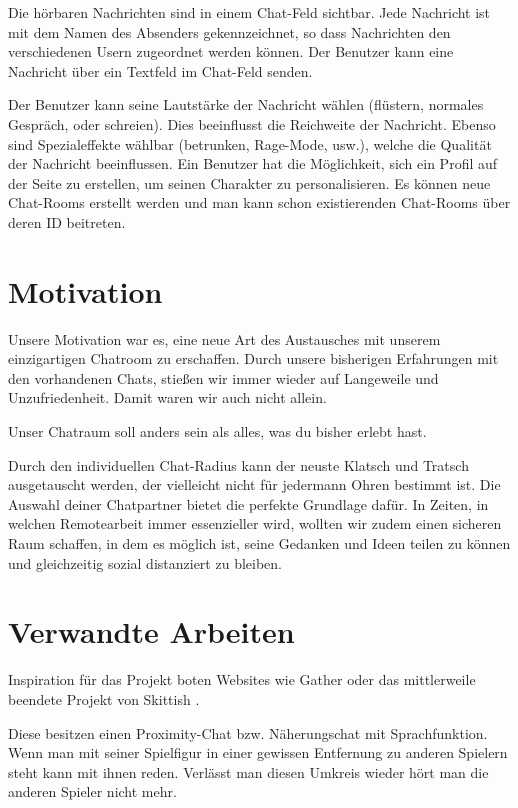 \documentclass[conference]{IEEEtran}
\begin{document}
	Die hörbaren Nachrichten sind in einem Chat-Feld sichtbar. Jede Nachricht ist mit dem Namen des Absenders gekennzeichnet, so dass Nachrichten den verschiedenen Usern zugeordnet werden können. Der Benutzer kann eine Nachricht über ein Textfeld im Chat-Feld senden.
	
	Der Benutzer kann seine Lautstärke der Nachricht wählen (flüstern, normales Gespräch, oder schreien). Dies beeinflusst die Reichweite der Nachricht. Ebenso sind Spezialeffekte wählbar (betrunken, Rage-Mode, usw.), welche die Qualität der Nachricht beeinflussen. Ein Benutzer hat die Möglichkeit, sich ein Profil auf der Seite zu erstellen, um seinen Charakter zu personalisieren. Es können neue Chat-Rooms erstellt werden und man kann schon existierenden Chat-Rooms über deren ID beitreten.
	\ \\

	\section{Motivation}
	Unsere Motivation war es, eine neue Art des Austausches mit unserem einzigartigen Chatroom zu erschaffen. 
	Durch unsere bisherigen Erfahrungen mit den vorhandenen Chats, stießen wir immer wieder auf Langeweile und Unzufriedenheit. Damit waren wir auch nicht allein.
	
	Unser Chatraum soll anders sein als alles, was du bisher erlebt hast.
	
	Durch den individuellen Chat-Radius kann der neuste Klatsch und Tratsch ausgetauscht werden, der vielleicht nicht für jedermann Ohren bestimmt ist. Die Auswahl deiner Chatpartner bietet die perfekte Grundlage dafür. 
	In Zeiten, in welchen Remotearbeit immer essenzieller wird, wollten wir zudem einen sicheren Raum schaffen, in dem es möglich ist, seine Gedanken und Ideen teilen zu können und gleichzeitig sozial distanziert zu bleiben.
	\ \\

	\section{Verwandte Arbeiten}
	Inspiration für das Projekt boten Websites wie Gather \cite{gathertown} oder das mittlerweile beendete Projekt von Skittish \cite{skittish}.
	
	Diese besitzen einen Proximity-Chat bzw. Näherungschat mit Sprachfunktion. Wenn man mit seiner Spielfigur in einer gewissen Entfernung zu anderen Spielern steht kann mit ihnen reden. Verlässt man diesen Umkreis wieder hört man die anderen Spieler nicht mehr.
	
\end{document}
